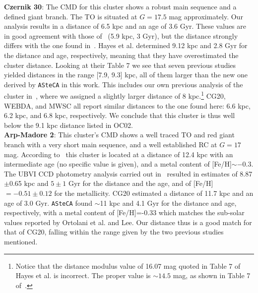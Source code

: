 \documentclass[draft]{aa}
\begin{document}
\begin{appendix}
  \noindent \textbf{Czernik 30}: The CMD for this cluster shows a robust main sequence
  and a defined giant branch. The TO is situated at $G=17.5$ mag approximately.
  Our analysis results in a distance of 6.5 kpc and an age of 3.6 Gyr. These
  values are in good agreement with those of~\cite{Dias_2021} (5.9 kpc, 3 Gyr),
  but the distance strongly differs with the one found in~\cite{Hayes_2015}.
  Hayes et al. determined 9.12 kpc and 2.8 Gyr for the distance and age,
  respectively, meaning that they have overestimated the cluster distance.
  Looking at their Table 7 we see that seven previous studies yielded distances
  in the range [7.9, 9.3] kpc, all of them larger than the new one derived by
  \texttt{ASteCA} in this work. This includes our own previous analysis of the
  cluster in~\cite{Perren_2015}, where we assigned a slightly larger distance of
  8 kpc.\footnote{Notice that the distance modulus value of 16.07 mag quoted in
  Table 7 of Hayes et al. is incorrect. The proper value is $\sim14.5$ mag, as
  shown in Table 7 of~\cite{Perren_2015}.}
  CG20, WEBDA, and MWSC all report similar distances to the one found here:
  6.6 kpc, 6.2 kpc, and 6.8 kpc, respectively. We conclude that this cluster
  is thus well below the 9.1 kpc distance listed in OC02.\\

  \noindent \textbf{Arp-Madore 2}: This cluster's CMD shows a well traced TO and
  red giant branch with a very short main sequence, and a
  well established RC at $G=17$ mag.
  According to~\cite{Ortolani_1995} this cluster is located at a distance of
  12.4 kpc with an intermediate age (no specific value is given), and a metal
  content of [Fe/H]$\sim-0.3$.
  The UBVI CCD photometry analysis carried out in~\cite{Lee_1997} resulted in
  estimates of 8.87$\pm$0.65 kpc and $5\pm1$ Gyr for the distance and the age,
  and of [Fe/H]$=-0.51\pm0.12$ for the metallicity.
  CG20 estimated a distance of 11.7 kpc and an age of 3.0 Gyr.
  \texttt{ASteCA} found $\sim$11 kpc and 4.1 Gyr for the distance and
  age, respectively, with a metal content of [Fe/H]=-0.33 which matches the
  sub-solar values reported by Ortolani et al. and Lee.
  Our distance thus is a good match for that of CG20, falling within the range
  given by the two previous studies mentioned.\\


\end{appendix}
\end{document}
